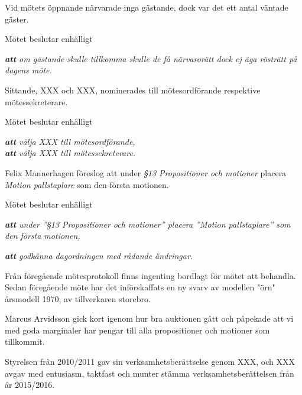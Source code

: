 
Vid mötets öppnande närvarade inga gästande, dock var det ett antal väntade gäster.

Mötet beslutar enhälligt

\emph{\textbf{att} om  gästande skulle tillkomma skulle de få närvarorätt dock ej äga rösträtt på dagens möte.}






Sittande, XXX och XXX, nominerades till \newline mötesordförande respektive mötessekreterare. 

Mötet beslutar enhälligt

\emph{\textbf{att} välja XXX till mötesordförande,}\\
\emph{\textbf{att} välja XXX till mötessekreterare.}



\newpage


Felix Mannerhagen föreslog att under \emph{§13 Propositioner och motioner} placera \emph{Motion pallstaplare} som den första motionen.

Mötet beslutar enhälligt

\emph{\textbf{att} under ''§13 Propositioner och motioner'' placera ''Motion pallstaplare'' som den första motionen,}

\emph{\textbf{att} godkänna dagordningen med rådande ändringar.}




Från föregående mötesprotokoll finns ingenting bordlagt för mötet att behandla. Sedan föregående möte har det införskaffats en ny svarv av modellen "örn" årsmodell 1970, av tillverkaren storebro.




Marcus Arvidsson gick kort igenom hur bra auktionen gått och påpekade att vi med goda marginaler har pengar till alla propositioner och motioner som tillkommit.






\sect[Verksamhetsberättelser]

Styrelsen från 2010/2011 gav sin verksamhetsberättselse genom XXX, och XXX avgav med entusiasm, taktfast och munter stämma verksamhetsberättelsen från år 2015/2016. 


